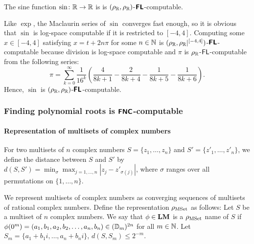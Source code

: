 \documentclass[envcountsame,orivec,oribibl]{llncs}
\begin{document}
\begin{lemma}
  The sine function $\sin \colon \mathbb R \to \mathbb R$ is
 is $(\rho _\mathbb R, \rho _\mathbb R)$-$\text{\bfseries \sffamily \upshape FL}$-computable.
\end{lemma}
Like $\exp$, the Maclaurin series of $\sin$ converges fast enough,
so it is obvious that $\sin$ is log-space computable if it is restricted to $[-4, 4]$.
Computing some $x \in [-4, 4]$ satisfying $x = t + 2n\pi$ for 
some $n \in \mathbb N$ is
$(\rho _\mathbb R, \rho _\mathbb R|^{[-4,4]})$-$\text{\bfseries \sffamily \upshape FL}$-computable because division is log-space computable and $\pi$ is $\rho _\mathbb R$-$\mathsf{FL}$-computable from the following series:
\begin{equation}
 \pi = \sum_{k=0}^\infty \frac{1}{16^k} 
  \left( \frac{4}{8k+1} - \frac{2}{8k+4} - \frac{1}{8k+5} - \frac{1}{8k+6} \right).
\end{equation}
Hence, $\sin$ is $(\rho _\mathbb R, \rho _\mathbb R)$-$\text{\bfseries \sffamily \upshape FL}$-computable.



\subsubsection{Finding polynomial roots is $\text{\bfseries \sffamily \upshape FNC}$-computable}

\paragraph{Representation of multisets of complex numbers}

For two multisets of $n$ complex numbers $S = \{z_1, \dots, z_n\}$ and $S' = \{z'_1, \dots, z'_n\}$,
we define the distance between $S$ and $S'$ by $
d(S, S') = \min_{\sigma} \max_{j = 1, \ldots, n}|z_j - z'_{\sigma(j)}|$,
where $\sigma$ ranges over all permutations on $\{1, \ldots, n\}$. 

We represent multisets of complex numbers as converging sequences of 
multisets of rational complex numbers.
Define the representation $\rho_{\mathrm{MSet}}$ as follows:
Let $S$ be a multiset of $n$ complex numbers. 
We say that $\phi \in \mathbf{LM}$ is a $\rho_{\mathrm{MSet}}$ name of $S$ if
$\phi(0^m) = ( a_1, b_1, a_2, b_2, \dots, a_n, b_n ) \in (\mathbb D_m)^{2n}$
for all $m \in \mathbb N$.
Let $S_m = \{a_1+b_1 i, \dots, a_n+b_n i\}$, 
$d(S, S_m) \le 2^{-m}$.

\end{document}
